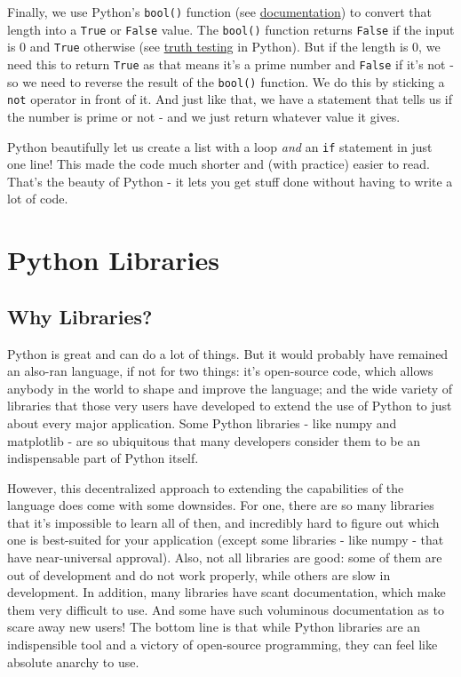 \documentclass[12pt]{article}
\newcommand{\code}{\texttt}
\begin{document}
Finally, we use Python's \code{bool()} function (see \href{https://docs.python.org/3/library/functions.html#bool}{documentation}) to convert that length into a \code{True} or \code{False} value. The \code{bool()} function returns \code{False} if the input is 0 and \code{True} otherwise (see \href{https://docs.python.org/3/library/stdtypes.html#truth}{truth testing} in Python). But if the length is 0, we need this to return \code{True} as that means it's a prime number and \code{False} if it's not - so we need to reverse the result of the \code{bool()} function. We do this by sticking a \code{not} operator in front of it. And just like that, we have a statement that tells us if the number is prime or not - and we just return whatever value it gives. 

Python beautifully let us create a list with a loop \textit{and} an \code{if} statement in just one line! This made the code much shorter and (with practice) easier to read. That's the beauty of Python - it lets you get stuff done without having to write a lot of code.

\newpage
\section{Python Libraries}
\subsection{Why Libraries?}
Python is great and can do a lot of things. But it would probably have remained an also-ran language, if not for two things: it's open-source code, which allows anybody in the world to shape and improve the language; and the wide variety of libraries that those very users have developed to extend the use of Python to just about every major application. Some Python libraries - like numpy and matplotlib - are so ubiquitous that many developers consider them to be an indispensable part of Python itself.

However, this decentralized approach to extending the capabilities of the language does come with some downsides. For one, there are so many libraries that it's impossible to learn all of then, and incredibly hard to figure out which one is best-suited for your application (except some libraries - like numpy - that have near-universal approval). Also, not all libraries are good: some of them are out of development and do not work properly, while others are slow in development. In addition, many libraries have scant documentation, which make them very difficult to use. And some have such voluminous documentation as to scare away new users! The bottom line is that while Python libraries are an indispensible tool and a victory of open-source programming, they can feel like absolute anarchy to use. 
\end{document}
